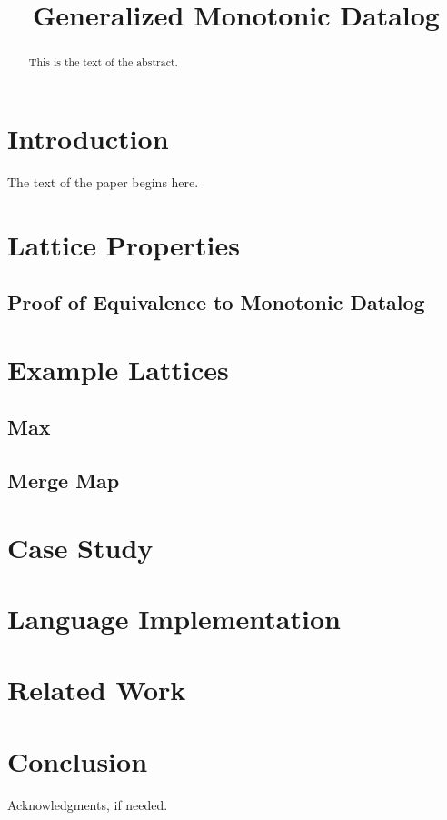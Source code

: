 \documentclass[preprint]{sigplanconf}
\begin{document}
\copyrightdata{[to be supplied]} 

\title{Generalized Monotonic Datalog}


\maketitle

\begin{abstract}
This is the text of the abstract.
\end{abstract}

\section{Introduction}

The text of the paper begins here.\cite{Alvaro2011}

\section{Lattice Properties}

\subsection{Proof of Equivalence to Monotonic Datalog}

\section{Example Lattices}

\subsection{Max}

\subsection{Merge Map}

\section{Case Study}

\section{Language Implementation}

\section{Related Work}

\section{Conclusion}

\acks
Acknowledgments, if needed.




\end{document}
